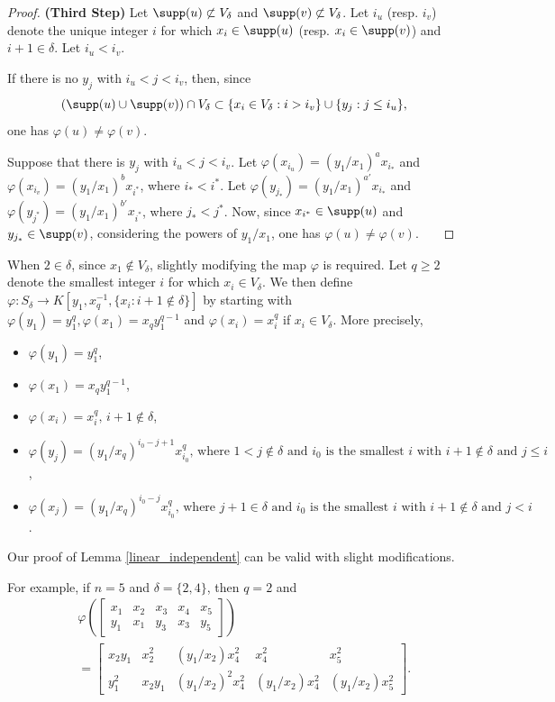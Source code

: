 \documentclass[12pt]{amsart}
\let\to=\rightarrow
\begin{document}
\begin{proof}
\medskip

\noindent
{\bf (Third Step)}  Let $\supp(u) \not\subset V_\delta$ and $\supp(v) \not\subset V_\delta$.  Let $i_u$ (resp. $i_v$) denote the unique integer $i$ for which $x_{i} \in \supp(u)$ (resp. $x_{i} \in \supp(v)$) and $i+1 \in \delta$.  Let $i_u < i_v$.

If there is no $y_j$ with $i_u < j < i_v$, then, since 
\[
(\supp(u) \cup \supp(v) )\cap V_\delta \subset \{x_i \in V_\delta : i > i_v\} \cup \{y_j : j \leq i_u\}, 
\]
one has $\varphi(u) \neq \varphi(v)$.

Suppose that there is $y_j$ with $i_u < j < i_v$.  Let $\varphi(x_{i_u}) = (y_1/x_1)^a x_{i_*}$ and $\varphi(x_{i_v}) = (y_1/x_1)^b x_{i^*}$, where $i_* < i^*$.  Let $\varphi(y_{j_*}) = (y_1/x_1)^{a'} x_{i_*}$ and $\varphi(y_{j^*}) = (y_1/x_1)^{b'} x_{i^*}$, where $j_* < j^*$.  Now, since $x_{i^*} \in \supp(u)$ and $y_{j_*} \in \supp(v)$,  considering the powers of $y_1/x_1$, one has $\varphi(u) \neq \varphi(v)$. 
\, \, \, 
\end{proof}

When $2 \in \delta$, since $x_1 \not\in V_\delta$, slightly modifying the map $\varphi$ is required.  Let $q \geq 2$ denote the smallest integer $i$ for which $x_i \in V_\delta$.  We then define $\varphi: S_\delta \to K[y_1, x_{q}^{-1}, \{x_i : i+1 \not\in \delta\}]$ by starting with $\varphi(y_1) = y_1^{q}, \varphi(x_1) = x_{q}y_1^{q-1}$ and $\varphi(x_i) = x_i^{q}$ if $x_i \in V_\delta$.  More precisely,  

\begin{itemize}
    \item 
    $\varphi(y_1)=y_1^q$,
    \item 
    $\varphi(x_1) = x_{q}y_1^{q-1}$,
    \item 
    $\varphi(x_i)=x_i^q, \, i+1 \not\in \delta$,
    \item 
    $\varphi(y_j)=(y_1/x_q)^{i_0-j+1}x_{i_0}^q, \, \text{where $1 < j \not\in \delta$ and $i_0$ is the smallest $i$ with $i+1 \not\in \delta$ and  $j \leq i$}$,
    \item
    $\varphi(x_j)=(y_1/x_q)^{i_0-j}x_{i_0}^q, \, \text{where $j+1 \in \delta$ and $i_0$ is the smallest $i$ with $i+1 \not\in \delta$ and  $j < i$}$.
\end{itemize}
Our proof of Lemma \ref{linear_independent} can be valid with slight modifications. 


For example, if $n=5$ and $\delta=\{2,4\}$, then $q=2$ and
\begin{eqnarray*}
&&\varphi\left(
\begin{bmatrix}
   x_1 & x_2 & x_3 & x_4 & x_5  \\
   y_1 & x_1 & y_3 & x_3 & y_5   
\end{bmatrix}
\right) \\
&&=
\begin{bmatrix}
   x_2 y_1& x_2^2 & (y_1/x_2)x_4^2 & x_4^2 & x_5^2  \\   
   y_1^2 & x_2 y_1 & (y_1/x_2)^2x_4^2 & (y_1/x_2)x_4^2 & (y_1/x_2)x_5^2   
\end{bmatrix}.
\end{eqnarray*}
\end{document}
